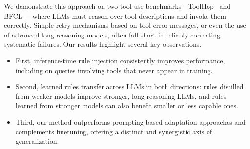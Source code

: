 \documentclass[11pt]{article}
\begin{document}

We demonstrate this approach on two tool-use benchmarks—ToolHop~\citep{ye2025toolhop} and BFCL~\citep{berkeley-function-calling-leaderboard}—where LLMs must reason over tool descriptions and invoke them correctly. Simple retry mechanisms based on tool error messages, or even the use of advanced long reasoning models, often fall short in reliably correcting systematic failures.
Our results highlight several key observations. 
\begin{itemize}
    \item First, inference-time rule injection consistently improves performance, including on queries involving tools that never appear in training.%
    \item Second, learned rules transfer across LLMs in both directions: rules distilled from weaker models improve stronger, long-reasoning LLMs, and rules learned from stronger models can also benefit smaller or less capable ones.
    \item Third, our method outperforms prompting based adaptation approaches and complements finetuning, offering a distinct and synergistic axis of generalization. 
\end{itemize}
\end{document}
